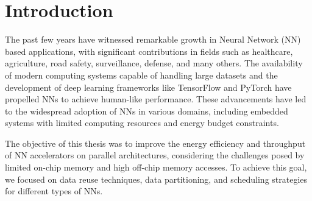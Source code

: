 \begin{comment}
\section{Conclusion}
In conclusion, this thesis has made significant strides in the realm of energy-efficient NN inferencing on edge devices. By leveraging data reuse techniques, quantization approaches, and an analytical framework for estimating off-chip memory accesses, we have demonstrated that it is possible to achieve remarkable energy efficiency improvements without sacrificing accuracy. The proposed solutions contribute to the advancement of NN accelerators for a wide range of applications, from healthcare and agriculture to autonomous driving and recommender systems.

The findings presented in this work offer valuable insights into optimizing neural network performance on parallel architectures, with implications for the broader domain of artificial intelligence. As the field of NN applications continues to grow and evolve, the research conducted here paves the way for more energy-efficient, high-performance NN inferencing on edge devices.

We hope that the outcomes of this research will inspire further exploration and innovation, ultimately leading to the development of smarter and more energy-conscious artificial intelligence systems that positively impact various aspects of human life.
\end{comment}

\section{Introduction}
The past few years have witnessed remarkable growth in Neural Network (NN) based applications, with significant contributions in fields such as healthcare, agriculture, road safety, surveillance, defense, and many others. The availability of modern computing systems capable of handling large datasets and the development of deep learning frameworks like TensorFlow and PyTorch have propelled NNs to achieve human-like performance. These advancements have led to the widespread adoption of NNs in various domains, including embedded systems with limited computing resources and energy budget constraints.

The objective of this thesis was to improve the energy efficiency and throughput of NN accelerators on parallel architectures, considering the challenges posed by limited on-chip memory and high off-chip memory accesses. To achieve this goal, we focused on data reuse techniques, data partitioning, and scheduling strategies for different types of NNs.

